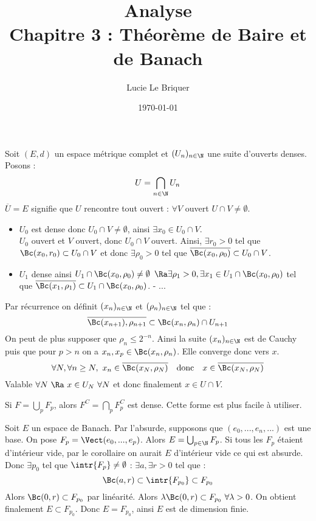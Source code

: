 

\title{\LARGE \textbf{Analyse}\\ Chapitre 3 : Théorème de Baire et de Banach}
\author{\large Lucie Le Briquer}
\date{\today}


\maketitle


\prvv
Soit $(E,d)$ un espace métrique complet et $(U_n)_{n\in\N}$ une suite d'ouverts denses. Posons :
$$U=\bigcap_{n\in\N} U_n$$
$\overline U=E$ signifie que $U$ rencontre tout ouvert : $\forall V$ ouvert $U\cap V\neq\emptyset$.
\begin{itemize}
  \item $U_0$ est dense donc $U_0\cap V\neq\emptyset$, ainsi $\exists x_0\in U_0\cap V$.
  \\ $U_0$ ouvert et $V$ ouvert, donc $U_0\cap V$ ouvert. Ainsi, $\exists r_0>0$ tel que $\Bc(x_0,r_0)\subset U_0\cap V$ et donc $\exists \rho_0>0$ tel que $\overline{\Bc(x_0,\rho_0)}\subset U_0\cap V$.
  \item $U_1$ dense ainsi $U_1\cap\Bc(x_0,\rho_0)\neq\emptyset$ $\Ra \exists\rho_1>0,\exists x_1\in U_1\cap\Bc(x_0,\rho_0)$ tel que $\overline{\Bc(x_1,\rho_1)}\subset U_1\cap\Bc(x_0,\rho_0)$.
    - ...
\end{itemize}
Par récurrence on définit $(x_n)_{n\in\N}$ et $(\rho_n)_{n\in\N}$ tel que :
$$\overline{\Bc(x_{n+1}),\rho_{n+1}}\subset\Bc(x_n,\rho_n)\cap U_{n+1}$$
On peut de plus supposer que $\rho_n\le 2^{-n}$. Ainsi la suite $(x_n)_{n\in\N}$ est de Cauchy puis que pour $p>n$ on a $x_n,x_p\in\Bc(x_n,\rho_n)$. Elle converge donc vers $x$.
$$\forall N,\forall n\ge N,\ x_n\in\overline{\Bc(x_N,\rho_N)}\quad\text{donc}\quad x\in\overline{\Bc(x_N,\rho_N)}$$
Valable $\forall N\ \Ra\ x\in U_N\ \forall N$ et donc finalement $x\in U\cap V$.
\prvf

\prvv
Si $F=\bigcup_p F_p$, alors $F^C=\bigcap_p F_p^C$ est dense.
\prvf
\rmk Cette forme est plus facile à utiliser.

\prvv
Soit $E$ un espace de Banach. Par l'absurde, supposons que $(e_0,...,e_n,...)$ est une base. On pose $F_p=\Vect(e_0,...,e_p)$. Alors $E=\bigcup_{p\in\N}F_p$.  Si tous les $F_p$ étaient d'intérieur vide, par le corollaire on aurait $E$ d'intérieur vide ce qui est absurde.
\\ Donc $\exists p_0$ tel que $\intr{F_p}\neq\emptyset$ : $\exists a,\exists r>0$ tel que :
$$\Bc(a,r)\subset \intr{F_{p_0}}\subset F_{p_0}$$
Alors $\Bc(0,r)\subset F_{p_0}$ par linéarité. Alors $\lambda\Bc(0,r)\subset F_{p_0}\ \forall\lambda>0$. On obtient finalement $E\subset F_{p_0}$. Donc $E=F_{p_0}$, ainsi $E$ est de dimension finie.
\prvf

